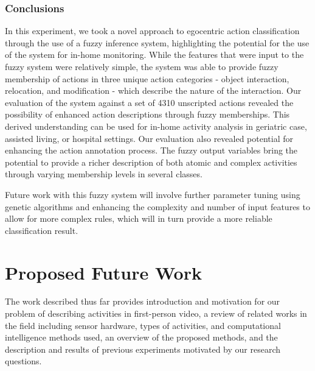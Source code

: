 \documentclass[12pt]{report}
\begin{document}
\subsection{Conclusions}
In this experiment, we took a novel approach to egocentric action classification through the use of a fuzzy inference system, highlighting the potential for the use of the system for in-home monitoring. While the features that were input to the fuzzy system were relatively simple, the system was able to provide fuzzy membership of actions in three unique action categories - object interaction, relocation, and modification - which describe the nature of the interaction. Our evaluation of the system against a set of 4310 unscripted actions revealed the possibility of enhanced action descriptions through fuzzy memberships. This derived understanding can be used for in-home activity analysis in geriatric case, assisted living, or hospital settings. Our evaluation also revealed potential for enhancing the action annotation process. The fuzzy output variables bring the potential to provide a richer description of both atomic and complex activities through varying membership levels in several classes.

Future work with this fuzzy system will involve further parameter tuning using genetic algorithms and enhancing the complexity and number of input features to allow for more complex rules, which will in turn provide a more reliable classification result.





\chapter{Proposed Future Work}
The work described thus far provides introduction and motivation for our problem of describing activities in first-person video, a review of related works in the field including sensor hardware, types of activities, and computational intelligence methods used, an overview of the proposed methods, and the description and results of previous experiments motivated by our research questions. 
\end{document}
